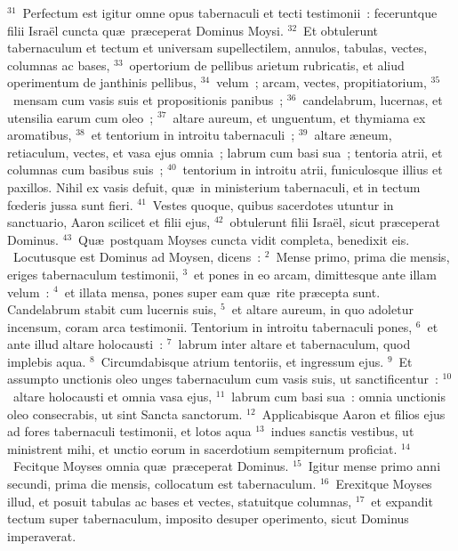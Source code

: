 ${}^{31}$~Perfectum est igitur omne opus tabernaculi et tecti testimonii~: feceruntque filii Isra\"el cuncta qu\ae\ pr\ae ceperat Dominus Moysi.
${}^{32}$~Et obtulerunt tabernaculum et tectum et universam supellectilem, annulos, tabulas, vectes, columnas ac bases,
${}^{33}$~opertorium de pellibus arietum rubricatis, et aliud operimentum de janthinis pellibus,
${}^{34}$~velum~; arcam, vectes, propitiatorium,
${}^{35}$~mensam cum vasis suis et propositionis panibus~;
${}^{36}$~candelabrum, lucernas, et utensilia earum cum oleo~;
${}^{37}$~altare aureum, et unguentum, et thymiama ex aromatibus,
${}^{38}$~et tentorium in introitu tabernaculi~;
${}^{39}$~altare \ae neum, retiaculum, vectes, et vasa ejus omnia~; labrum cum basi sua~; tentoria atrii, et columnas cum basibus suis~;
${}^{40}$~tentorium in introitu atrii, funiculosque illius et paxillos. Nihil ex vasis defuit, qu\ae\ in ministerium tabernaculi, et in tectum fœderis jussa sunt fieri.
${}^{41}$~Vestes quoque, quibus sacerdotes utuntur in sanctuario, Aaron scilicet et filii ejus,
${}^{42}$~obtulerunt filii Isra\"el, sicut pr\ae ceperat Dominus.
${}^{43}$~Qu\ae\ postquam Moyses cuncta vidit completa, benedixit eis.
~\lettrine[lines=10,image=true,loversize=0.05,lraise=-0.03]{L}{}ocutusque est Dominus ad Moysen, dicens~:
${}^{2}$~Mense primo, prima die mensis, eriges tabernaculum testimonii,
${}^{3}$~et pones in eo arcam, dimittesque ante illam velum~:
${}^{4}$~et illata mensa, pones super eam qu\ae\ rite pr\ae cepta sunt. Candelabrum stabit cum lucernis suis,
${}^{5}$~et altare aureum, in quo adoletur incensum, coram arca testimonii. Tentorium in introitu tabernaculi pones,
${}^{6}$~et ante illud altare holocausti~:
${}^{7}$~labrum inter altare et tabernaculum, quod implebis aqua.
${}^{8}$~Circumdabisque atrium tentoriis, et ingressum ejus.
${}^{9}$~Et assumpto unctionis oleo unges tabernaculum cum vasis suis, ut sanctificentur~:
${}^{10}$~altare holocausti et omnia vasa ejus,
${}^{11}$~labrum cum basi sua~: omnia unctionis oleo consecrabis, ut sint Sancta sanctorum.
${}^{12}$~Applicabisque Aaron et filios ejus ad fores tabernaculi testimonii, et lotos aqua
${}^{13}$~indues sanctis vestibus, ut ministrent mihi, et unctio eorum in sacerdotium sempiternum proficiat.
${}^{14}$~Fecitque Moyses omnia qu\ae\ pr\ae ceperat Dominus.
${}^{15}$~Igitur mense primo anni secundi, prima die mensis, collocatum est tabernaculum.
${}^{16}$~Erexitque Moyses illud, et posuit tabulas ac bases et vectes, statuitque columnas,
${}^{17}$~et expandit tectum super tabernaculum, imposito desuper operimento, sicut Dominus imperaverat.
